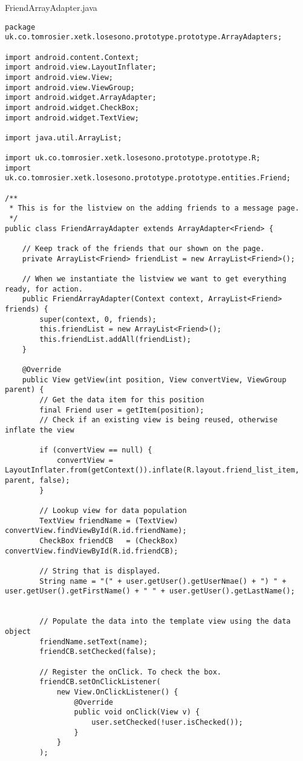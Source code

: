 FriendArrayAdapter.java
\begin{lstlisting}
package uk.co.tomrosier.xetk.losesono.prototype.prototype.ArrayAdapters;

import android.content.Context;
import android.view.LayoutInflater;
import android.view.View;
import android.view.ViewGroup;
import android.widget.ArrayAdapter;
import android.widget.CheckBox;
import android.widget.TextView;

import java.util.ArrayList;

import uk.co.tomrosier.xetk.losesono.prototype.prototype.R;
import uk.co.tomrosier.xetk.losesono.prototype.prototype.entities.Friend;

/**
 * This is for the listview on the adding friends to a message page.
 */
public class FriendArrayAdapter extends ArrayAdapter<Friend> {

    // Keep track of the friends that our shown on the page.
    private ArrayList<Friend> friendList = new ArrayList<Friend>();

    // When we instantiate the listview we want to get everything ready, for action.
    public FriendArrayAdapter(Context context, ArrayList<Friend> friends) {
        super(context, 0, friends);
        this.friendList = new ArrayList<Friend>();
        this.friendList.addAll(friendList);
    }

    @Override
    public View getView(int position, View convertView, ViewGroup parent) {
        // Get the data item for this position
        final Friend user = getItem(position);
        // Check if an existing view is being reused, otherwise inflate the view

        if (convertView == null) {
            convertView = LayoutInflater.from(getContext()).inflate(R.layout.friend_list_item, parent, false);
        }

        // Lookup view for data population
        TextView friendName = (TextView) convertView.findViewById(R.id.friendName);
        CheckBox friendCB   = (CheckBox) convertView.findViewById(R.id.friendCB);

        // String that is displayed.
        String name = "(" + user.getUser().getUserNmae() + ") " + user.getUser().getFirstName() + " " + user.getUser().getLastName();


        // Populate the data into the template view using the data object
        friendName.setText(name);
        friendCB.setChecked(false);

        // Register the onClick. To check the box.
        friendCB.setOnClickListener(
            new View.OnClickListener() {
                @Override
                public void onClick(View v) {
                    user.setChecked(!user.isChecked());
                }
            }
        );


\end{lstlisting}

